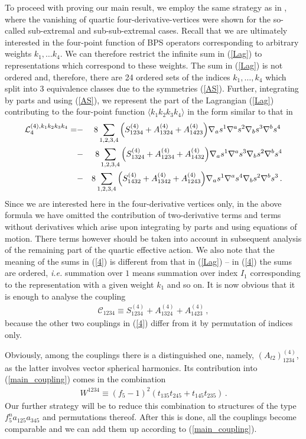 \documentclass[12pt,a4paper]{article}
\numberwithin{equation}{section}
\newcommand{\bea}{\begin{eqnarray}}
\newcommand{\eea}{\end{eqnarray}}
\def\la{\label}
\def\na{{\nabla}}
\def\la{\label}
\begin{document}
To proceed with proving our main result, we employ the same strategy as in \cite{Arutyunov:2000ima}, where the vanishing of quartic four-derivative-vertices were shown for the so-called sub-extremal
and sub-sub-extremal cases. Recall that we are ultimately interested in the four-point function of BPS operators corresponding to arbitrary weights $k_1,\ldots k_4$. We can therefore 
restrict the infinite sum in (\ref{Lag}) to representations which correspond to these weights. The sum in (\ref{Lag}) is not ordered and, therefore, there are 24 ordered sets of 
the indices $k_1,\ldots, k_4$ which split into 3 equivalence classes due to the symmetries  (\ref{AS}). Further, integrating by parts and using (\ref{AS}), we represent the part of the Lagrangian (\ref{Lag}) 
contributing to the four-point function $\langle k_1k_2k_3k_4\rangle$ in the form similar to that in \cite{Arutyunov:2000ima}
\bea
{\cal L}_4^{(4),k_1k_2k_3k_4}=&-&8\sum_{1,2,3,4}\Big( S_{1234}^{(4)}
+A_{1324}^{(4)}+A_{1423}^{(4)}\Big)
\na_a s^{1}\na^as^{2}\na_bs^{3}\na^bs^{4}\, \nonumber \\
&-&8\sum_{1,2,3,4}\Big( S_{1324}^{(4)}
+A_{1234}^{(4)}+A_{1432}^{(4)}\Big)
\na_a s^{1}\na^as^{3}\na_bs^{2}\na^bs^{4}    \la{4}  \\
&-&8\sum_{1,2,3,4}\Big( S_{1432}^{(4)}
+A_{1342}^{(4)}+A_{1243}^{(4)}\Big)
\na_a s^{1}\na^as^{4}\na_bs^{2}\na^bs^{3}\, . \nonumber \eea
Since we are interested here in the four-derivative vertices only, in the above formula 
we have omitted the contribution of two-derivative terms and terms without derivatives which arise upon integrating by parts and 
using equations of motion. There terms however should be taken into account in subsequent analysis of the remaining part of the quartic effective action.
We also note that the meaning of the sums in (\ref{4}) is different from that in (\ref{Lag}) -- in (\ref{4}) the sums are ordered, {\it i.e.} summation over $1$ means summation over 
index $I_1$ corresponding to the representation with a given weight $k_1$ and so on. It is now obvious that it is enough to analyse the coupling
\bea
\la{main_coupling}
{\mathscr C}_{1234}\equiv S_{1234}^{(4)} + A_{1324}^{(4)} + A_{1423}^{(4)} \, ,
\eea
because the other two couplings in (\ref{4}) differ from it by permutation of indices only. 


Obviously, among the couplings there is a distinguished one, namely, $(A_{t2})^{(4)}_{1234}$, as the latter involves vector spherical harmonics. Its contribution into (\ref{main_coupling})
comes in the combination
\bea
\la{need_red}
W^{1234}\equiv (f_5-1)^2(t_{135}t_{245}+t_{145}t_{235})\, .
\eea
Our further strategy will be to reduce this combination to structures of the type $f_5^na_{125}a_{345}$ and permutations thereof. After this is done,
all the couplings become comparable and we can add them up according to (\ref{main_coupling}). 
\end{document}

